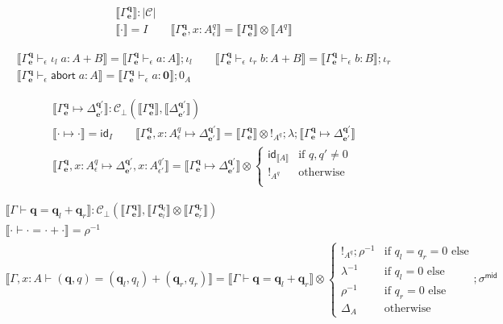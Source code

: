 \documentclass[acmsmall,screen,review]{acmart}
\newcommand{\mc}[1]{\ensuremath{\mathcal{#1}}}
\newcommand{\mb}[1]{\ensuremath{\mathbf{#1}}}
\newcommand{\ms}[1]{\ensuremath{\mathsf{#1}}}
\newcommand{\linl}[1]{\iota_l\;{#1}}
\newcommand{\linr}[1]{\iota_r\;{#1}}
\newcommand{\labort}[1]{\ms{abort}\;{#1}}
\newcommand{\qsp}[4]{#1 \vdash #2 = #3 + #4}
\newcommand{\cwk}[2]{#1 \mapsto #2}
\newcommand{\hasty}[4]{#1 \vdash_{#2} #3: {#4}}
\newcommand{\dnt}[1]{\llbracket{#1}\rrbracket}
\begin{document}
\begin{gather*}
  \boxed{\dnt{\Gamma^{\mb{q}}_{\mb{e}}} : |\mc{C}|} \\
  \dnt{\cdot} = I
  \qquad \dnt{\Gamma^{\mb{q}}_{\mb{e}}, x : A^q_\epsilon} 
          = \dnt{\Gamma^{\mb{q}}_{\mb{e}}} \otimes \dnt{A^q}
\end{gather*}


\begin{gather*}
  \dnt{\hasty{\Gamma^{\mb{q}}_{\mb{e}}}{\epsilon}{\linl{a}}{A + B}}
  = \dnt{\hasty{\Gamma^{\mb{q}}_{\mb{e}}}{\epsilon}{a}{A}} ; \iota_l \qquad
  \dnt{\hasty{\Gamma^{\mb{q}}_{\mb{e}}}{\epsilon}{\linr{b}}{A + B}}
  = \dnt{\hasty{\Gamma^{\mb{q}}_{\mb{e}}}{\epsilon}{b}{B}} ; \iota_r \\
  \dnt{\hasty{\Gamma^{\mb{q}}_{\mb{e}}}{\epsilon}{\labort{a}}{A}}
  = \dnt{\hasty{\Gamma^{\mb{q}}_{\mb{e}}}{\epsilon}{a}{\mb{0}}} ; 0_A
\end{gather*}

\begin{gather*}
  \boxed{\dnt{\cwk{\Gamma^{\mb{q}}_{\mb{e}}}{\Delta^{\mb{q}'}_{\mb{e}'}}} 
    : \mc{C}_\bot(\dnt{\Gamma^{\mb{q}}_{\mb{e}}}, \dnt{\Delta^{\mb{q}'}_{\mb{e}'}})} \\
  \dnt{\cwk{\cdot}{\cdot}} = \ms{id}_I \qquad
  \dnt{\cwk{\Gamma^{\mb{q}}_{\mb{e}}, x : A^q_\epsilon}{\Delta^{\mb{q}'}_{\mb{e}'}}}
    = \dnt{\Gamma^{\mb{q}}_{\mb{e}}} \otimes !_{A^q}
    ; \lambda
    ; \dnt{\cwk{\Gamma^{\mb{q}}_{\mb{e}}}{\Delta^{\mb{q}'}_{\mb{e}'}}} \\
  \dnt{\cwk{\Gamma^{\mb{q}}_{\mb{e}}, x : A^q_\epsilon}
            {\Delta^{\mb{q}'}_{\mb{e}'}, x : A^{q'}_{\epsilon'}}}
    = \dnt{\cwk{\Gamma^{\mb{q}}_{\mb{e}}}{\Delta^{\mb{q}'}_{\mb{e}'}}} \otimes \begin{cases}
      \ms{id}_{\dnt{A}} & \text{if } q, q' \neq 0 \\
      !_{A^q} & \text{otherwise} \\
    \end{cases}
\end{gather*}

\begin{gather*}
  \boxed{\dnt{\qsp{\Gamma}{\mb{q}}{\mb{q}_l}{\mb{q}_r}} 
    : \mc{C}_\bot(\dnt{\Gamma^{\mb{q}}_{\mb{e}}}, 
      \dnt{\Gamma^{\mb{q}_l}_{\mb{e}_l}} \otimes \dnt{\Gamma^{\mb{q}_r}_{\mb{e}_r}})} 
  \\
  \dnt{\qsp{\cdot}{\cdot}{\cdot}{\cdot}} = \rho^{-1}
  \\
  \dnt{\qsp{\Gamma, x : A}{(\mb{q}, q)}{(\mb{q}_l, q_l)}{(\mb{q}_r, q_r)}}
  = \dnt{\qsp{\Gamma}{\mb{q}}{\mb{q}_l}{\mb{q}_r}} \otimes
  \begin{cases}
    !_{A^q} ; \rho^{-1} & \text{if } q_l = q_r = 0 \text{ else} \\
    \lambda^{-1} & \text{if } q_l = 0 \text{ else} \\
    \rho^{-1} & \text{if } q_r = 0 \text{ else} \\
    \Delta_A & \text{otherwise}
  \end{cases} ; \sigma^{\ms{mid}}
\end{gather*}
\end{document}
